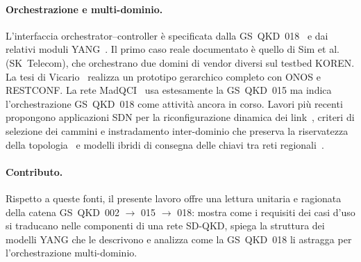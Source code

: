 \paragraph{Orchestrazione e multi-dominio.}
L'interfaccia orchestrator–controller è specificata dalla
GS~QKD~018~\cite{qkd018} e dai relativi moduli YANG~\cite{qkd018yang}. Il
primo caso reale documentato è quello di Sim et al.~\cite{sim2023}
(SK~Telecom), che orchestrano due domini di vendor diversi sul testbed
KOREN. La tesi di Vicario~\cite{vicario2025} realizza un prototipo
gerarchico completo con ONOS e RESTCONF. La rete MadQCI~\cite{madqci2024}
usa estesamente la GS~QKD~015 ma indica l'orchestrazione GS~QKD~018 come
attività ancora in corso. Lavori più recenti propongono applicazioni SDN per
la riconfigurazione dinamica dei link~\cite{mendez2026}, criteri di
selezione dei cammini e instradamento inter-dominio che preserva la
riservatezza della topologia~\cite{laschet2026} e modelli ibridi di
consegna delle chiavi tra reti regionali~\cite{interconnect2026}.

\paragraph{Contributo.}
Rispetto a queste fonti, il presente lavoro offre una lettura unitaria e
ragionata della catena GS~QKD~002 $\to$ 015 $\to$ 018: mostra come i
requisiti dei casi d'uso si traducano nelle componenti di una rete SD-QKD,
spiega la struttura dei modelli YANG che le descrivono e analizza come la
GS~QKD~018 li astragga per l'orchestrazione multi-dominio.
